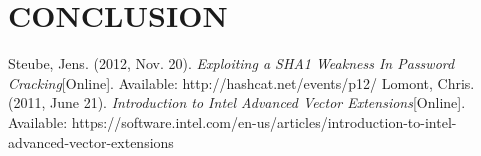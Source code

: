 \documentclass[letterpaper, 10 pt, conference]{ieeeconf}  %
\begin{document}

\section{CONCLUSION}
  

\addtolength{\textheight}{-12cm}   %

















\begin{thebibliography}{99}

 Steube, Jens. (2012, Nov. 20). \emph{Exploiting a SHA1 Weakness In Password Cracking}[Online]. Available: http://hashcat.net/events/p12/
 Lomont, Chris. (2011, June 21). \emph{Introduction to Intel Advanced Vector Extensions}[Online]. Available: https://software.intel.com/en-us/articles/introduction-to-intel-advanced-vector-extensions
 

\end{thebibliography}
\end{document}

